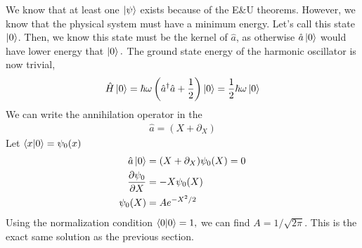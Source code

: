 \noindent We know that at least one \(\ket\psi\) exists because of the E\&U theorems. However, we know that the physical system must have a minimum energy. Let's call this state \(\ket0\). Then, we know this state must be the kernel of \(\hat a\), as otherwise \(\hat a\ket0\) would have lower energy that \(\ket0.\) The ground state energy of the harmonic oscillator is now trivial,
\begin{align}
    \hat H\ket 0=\hbar\omega\left(\hat a^\dagger\hat a+\frac{1}{2}\right)\ket 0=\frac{1}{2}\hbar\omega\ket0
\end{align}
We can write the annihilation operator in the
\begin{align}
    \hat{a}=\left(X+\partial_X\right)
\end{align}
Let \(\braket{x}{0}=\psi_0(x)\)
\begin{align}
    \hat a\ket0&=(X+\partial_X)\psi_0(X)=0\\
    \partialderivative{\psi_0}{X}&=-X\psi_0(X)\\
    \psi_0(X)&=Ae^{-X^2/2}
\end{align}
Using the normalization condition \(\braket{0}{0}=1,\) we can find \(A=1/\sqrt{2\pi}.\) This is the exact same solution as the previous section.
